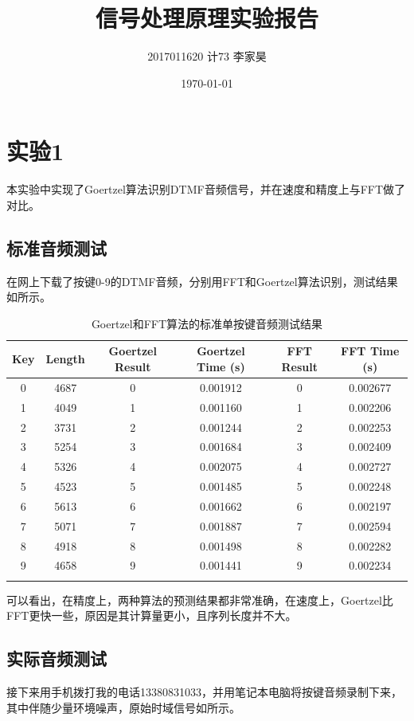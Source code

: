 \documentclass[12pt,a4paper]{article}
\title{信号处理原理实验报告}
\author{2017011620 计73 李家昊}
\date{\today}
\begin{document}
\maketitle

\section{实验1}

本实验中实现了Goertzel算法识别DTMF音频信号，并在速度和精度上与FFT做了对比。

\subsection{标准音频测试}

在网上下载了按键0-9的DTMF音频，分别用FFT和Goertzel算法识别，测试结果如所示。

\begin{longtable}[]{c|c|cccc}
    \toprule
    Key & Length & Goertzel Result & Goertzel Time (s) & FFT Result & FFT Time (s)\tabularnewline
    \midrule
    \endhead
    0 & 4687 & 0 & 0.001912 & 0 & 0.002677\tabularnewline
    1 & 4049 & 1 & 0.001160 & 1 & 0.002206\tabularnewline
    2 & 3731 & 2 & 0.001244 & 2 & 0.002253\tabularnewline
    3 & 5254 & 3 & 0.001684 & 3 & 0.002409\tabularnewline
    4 & 5326 & 4 & 0.002075 & 4 & 0.002727\tabularnewline
    5 & 4523 & 5 & 0.001485 & 5 & 0.002248\tabularnewline
    6 & 5613 & 6 & 0.001662 & 6 & 0.002197\tabularnewline
    7 & 5071 & 7 & 0.001887 & 7 & 0.002594\tabularnewline
    8 & 4918 & 8 & 0.001498 & 8 & 0.002282\tabularnewline
    9 & 4658 & 9 & 0.001441 & 9 & 0.002234\tabularnewline
    \bottomrule
    \caption{Goertzel和FFT算法的标准单按键音频测试结果}
    \label{tab:standard}
\end{longtable}

可以看出，在精度上，两种算法的预测结果都非常准确，在速度上，Goertzel比FFT更快一些，原因是其计算量更小，且序列长度并不大。

\subsection{实际音频测试}

接下来用手机拨打我的电话13380831033，并用笔记本电脑将按键音频录制下来，其中伴随少量环境噪声，原始时域信号如所示。
\end{document}
